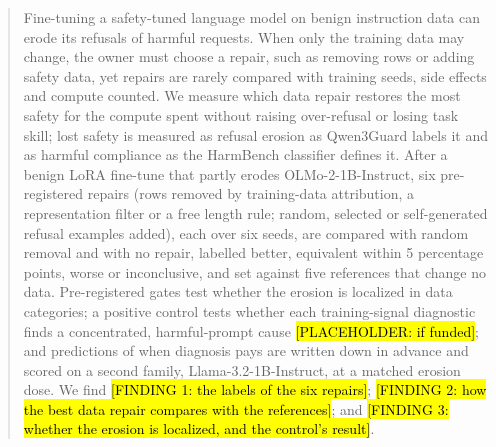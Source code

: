 \documentclass{article}
\theoremstyle{plain}
\theoremstyle{definition}
\theoremstyle{remark}
\newcommand{\ph}[1]{\hl{#1}}
\begin{document}

\printAffiliationsAndNotice{}  %


\begin{abstract}
  Fine-tuning a safety-tuned language model on benign instruction data can
  erode its refusals of harmful requests. When only the training data may
  change, the owner must choose a repair, such as removing rows or adding
  safety data, yet repairs are rarely compared with training seeds, side
  effects and compute counted. We measure which data repair restores the most
  safety for the compute spent without raising over-refusal or losing task
  skill; lost safety is measured as refusal erosion as Qwen3Guard labels it
  and as harmful compliance as the HarmBench classifier defines it. After a
  benign LoRA fine-tune that partly erodes OLMo-2-1B-Instruct, six
  pre-registered repairs (rows removed by training-data attribution, a
  representation filter or a free length rule; random, selected or
  self-generated refusal examples added), each over six seeds, are compared with random removal and with no repair, labelled better,
  equivalent within 5 percentage points, worse or inconclusive, and set
  against five references that change no data. Pre-registered gates test
  whether the erosion is localized in data categories; a positive control tests whether each training-signal diagnostic finds
  a concentrated, harmful-prompt cause \ph{[PLACEHOLDER: if
  funded]}; and predictions of when diagnosis pays are written down in
  advance and scored on a second family, Llama-3.2-1B-Instruct, at a matched
  erosion dose. We find \ph{[FINDING 1: the labels of the six repairs]};
  \ph{[FINDING 2: how the best data repair compares with the references]};
  and \ph{[FINDING 3: whether the erosion is localized, and the control's
  result]}.
\end{abstract}
\end{document}
